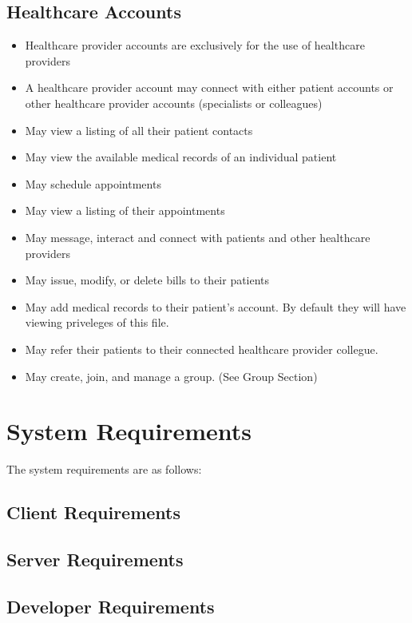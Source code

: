 \section{Healthcare Accounts}
\begin{itemize}
\item Healthcare provider accounts are exclusively for the use of healthcare providers
\item A healthcare provider account may connect with either patient accounts or other healthcare provider accounts (specialists or colleagues)
\item May view a listing of all their patient contacts
\item May view the available medical records of an individual patient
\item May schedule appointments
\item May view a listing of their appointments
\item May message, interact and connect with patients and other healthcare providers
\item May issue, modify, or delete bills to their patients
\item May add medical records to their patient's account. By default they will have viewing priveleges of this file.
\item May refer their patients to their connected healthcare provider collegue.
\item May create, join, and manage a group. (See Group Section)
\end{itemize}



\chapter{System Requirements}
The system requirements are as follows:

\section{Client Requirements}


\section{Server Requirements}

\section{Developer Requirements}

